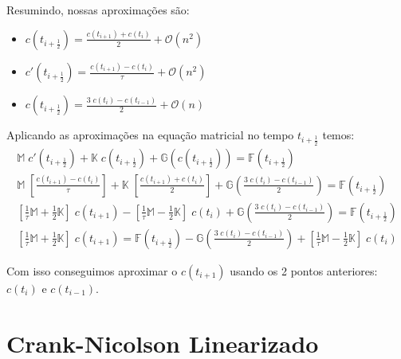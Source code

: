\documentclass[a4paper]{article}
\begin{document}
Resumindo, nossas aproximações são:
\begin{itemize}
\item \(
    c(t_{i+\frac12})
    =
    \frac{c(t_{i+1}) + c(t_i)}{2}
    + \mathcal{O}(n^2)
\)
\item \(
    c'(t_{i+\frac12})
    =
    \frac{c(t_{i+1}) - c(t_i)}{\tau}
    + \mathcal{O}(n^2)
\)
\item \(
    c(t_{i+\frac12})
    =
    \frac{3 \; c(t_i) - c(t_{i-1})}{2}
    + \mathcal{O}(n)
\)
\end{itemize}

Aplicando as aproximações na equação matricial
no tempo \(t_{i+\frac12}\)
temos:
\[ \begin{array}{l} \displaystyle
    \mathbb{M} \; c'(t_{i+\frac12})
    + \mathbb{K} \; c(t_{i+\frac12})
    + \mathbb{G}(c(t_{i+\frac12}))
    = \mathbb{F}\left( t_{i+\frac12} \right)
    \\[3ex] \displaystyle
    \mathbb{M} \; \left[ \frac{c(t_{i+1}) - c(t_i)}{\tau} \right]
    + \mathbb{K} \; \left[ \frac{c(t_{i+1}) + c(t_i)}{2} \right]
    + \mathbb{G}\left( \frac{3 \; c(t_i) - c(t_{i-1})}{2} \right)
    = \mathbb{F}\left( t_{i+\frac12} \right)
    \\[3ex] \displaystyle
    \left[ \frac1\tau \mathbb{M} + \frac12 \mathbb{K} \right] \; c(t_{i+1})
    - \left[ \frac1\tau \mathbb{M} - \frac12 \mathbb{K} \right] \; c(t_i)
    + \mathbb{G}\left( \frac{3 \; c(t_i) - c(t_{i-1})}{2} \right)
    = \mathbb{F}\left( t_{i+\frac12} \right)
    \\[3ex] \displaystyle
    \left[ \frac1\tau \mathbb{M} + \frac12 \mathbb{K} \right] \; c(t_{i+1})
    = \mathbb{F}\left( t_{i+\frac12} \right)
    - \mathbb{G}\left( \frac{3 \; c(t_i) - c(t_{i-1})}{2} \right)
    + \left[ \frac1\tau \mathbb{M} - \frac12 \mathbb{K} \right] \; c(t_i)
\end{array} \]

Com isso conseguimos aproximar o
\(c(t_{i+1})\) usando os 2 pontos anteriores:
\(c(t_i)\) e \(c(t_{i-1})\).

\section{Crank-Nicolson Linearizado}
\end{document}
